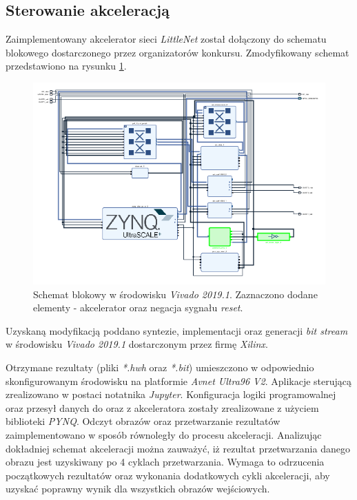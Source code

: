 \subsection{Sterowanie akceleracją}
\label{ch:sterowanie}
Zaimplementowany akcelerator sieci \emph{LittleNet} został dołączony do schematu blokowego dostarczonego przez organizatorów konkursu.
Zmodyfikowany schemat przedstawiono na rysunku \ref{fig:vivado}. 
\begin{figure}
    \centering
    \includegraphics[width=0.9\linewidth]{images/vivado.png}
    \caption{Schemat blokowy w środowisku \emph{Vivado 2019.1}. Zaznaczono dodane elementy - akcelerator oraz negacja sygnału \emph{reset}.}
    \label{fig:vivado}
\end{figure}

Uzyskaną modyfikacją poddano syntezie, implementacji oraz generacji \emph{bit stream} w środowisku \emph{Vivado 2019.1} dostarczonym przez firmę \emph{Xilinx}.

Otrzymane rezultaty (pliki \emph{*.hwh} oraz \emph{*.bit}) umieszczono w odpowiednio skonfigurowanym środowisku na platformie \emph{Avnet Ultra96 V2}.
Aplikacje sterującą zrealizowano w postaci notatnika \emph{Jupyter}.
Konfiguracja logiki programowalnej oraz przesył danych do oraz z akceleratora zostały zrealizowane z użyciem biblioteki \emph{PYNQ}. 
Odczyt obrazów oraz przetwarzanie rezultatów zaimplementowano w sposób równoległy do procesu akceleracji.
Analizując dokładniej schemat akceleracji można zauważyć, iż rezultat przetwarzania danego obrazu jest uzyskiwany po 4 cyklach przetwarzania.
Wymaga to odrzucenia początkowych rezultatów oraz wykonania dodatkowych cykli akceleracji, aby uzyskać poprawny wynik dla wszystkich obrazów wejściowych.



